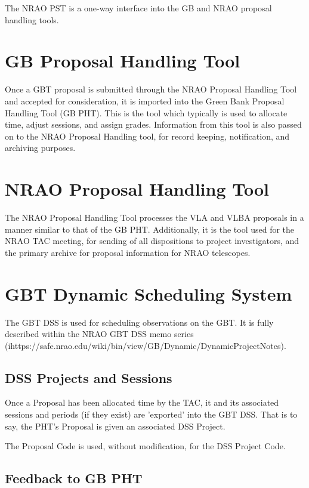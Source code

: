 \documentclass{article}
\begin{document}
The NRAO PST is a one-way interface into the GB and NRAO proposal handling tools.

\section{GB Proposal Handling Tool}\label{gb_pht_sec}

Once a GBT proposal is submitted through the NRAO Proposal Handling Tool and accepted for consideration, it is
imported into the Green Bank Proposal Handling Tool (GB PHT).  This is the tool which typically is used to allocate time, 
adjust sessions, and assign grades.  Information from this tool is also passed on to the NRAO Proposal Handling tool,
for record keeping, notification, and archiving purposes.


\section{NRAO Proposal Handling Tool}\label{nrao_pht_sec}

The NRAO Proposal Handling Tool processes the VLA and VLBA proposals in a manner similar to that of the GB PHT.  Additionally, it is the tool used for the NRAO TAC meeting, for sending of all dispositions to project investigators, and the primary archive for proposal information for NRAO telescopes.

\section{GBT Dynamic Scheduling System}\label{dss_sec}

The GBT DSS is used for scheduling observations on the GBT.  It is fully described within the NRAO GBT DSS memo series (ihttps://safe.nrao.edu/wiki/bin/view/GB/Dynamic/DynamicProjectNotes).

\subsection{DSS Projects and Sessions}

Once a Proposal has been allocated time by the TAC, it and its associated sessions and periods (if they exist) are 'exported' into the
GBT DSS.  That is to say, the PHT's Proposal is given an associated DSS Project.

The Proposal Code is used, without modification, for the DSS Project Code.

\subsection{Feedback to GB PHT}
\end{document}
